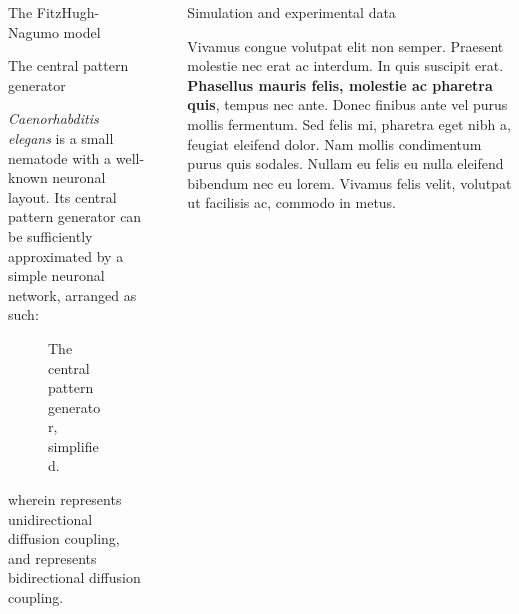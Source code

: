 \documentclass[final]{beamer}
\newcommand{\inputtikz}[1]{%
  \tikzsetnextfilename{#1}%
}
\newlength{\sepwidth}
\newlength{\colwidth}
\newcommand{\separatorcolumn}{\begin{column}{\sepwidth}\end{column}}
\begin{document}
\begin{frame}[t]
\begin{columns}[t]
\begin{column}{\colwidth}
\begin{block}{The FitzHugh-Nagumo model}
  \end{block}

  \begin{block}{The central pattern generator}

        \textit{Caenorhabditis elegans} is a small nematode with a well-known neuronal layout.  Its central pattern generator can be sufficiently approximated by a simple neuronal network, arranged as such:

        \begin{figure}
            \centering
            \inputtikz{figures/cpg/cpg}
            \caption{The central pattern generator, simplified.}
        \end{figure}

        wherein  represents unidirectional diffusion coupling, and  represents bidirectional diffusion coupling.

  \end{block}

\end{column}

\separatorcolumn

\begin{column}{\colwidth}

  \begin{block}{Simulation and experimental data}

    Vivamus congue volutpat elit non semper. Praesent molestie nec erat ac
    interdum. In quis suscipit erat. \textbf{Phasellus mauris felis, molestie
    ac pharetra quis}, tempus nec ante. Donec finibus ante vel purus mollis
    fermentum. Sed felis mi, pharetra eget nibh a, feugiat eleifend dolor. Nam
    mollis condimentum purus quis sodales. Nullam eu felis eu nulla eleifend
    bibendum nec eu lorem. Vivamus felis velit, volutpat ut facilisis ac,
    commodo in metus.


\end{block}
\end{column}
\end{columns}
\end{frame}
\end{document}
